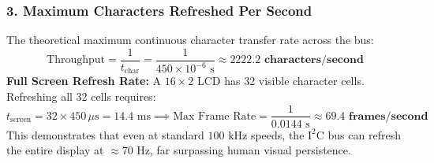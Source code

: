 \documentclass[11pt,a4paper]{article}
\begin{document}
\subsubsection*{3. Maximum Characters Refreshed Per Second}
The theoretical maximum continuous character transfer rate across the bus:
\begin{equation}
\text{Throughput} = \frac{1}{t_{\text{char}}} = \frac{1}{450\times 10^{-6}\text{ s}} \approx \mathbf{2222.2\text{ characters/second}}
\end{equation}
\textbf{Full Screen Refresh Rate:}  
A $16\times 2$ LCD has 32 visible character cells. Refreshing all 32 cells requires:
\begin{equation}
t_{\text{screen}} = 32 \times 450\,\mu\text{s} = 14.4\text{ ms} \implies \text{Max Frame Rate} = \frac{1}{0.0144\text{ s}} \approx \mathbf{69.4\text{ frames/second}}
\end{equation}
This demonstrates that even at standard $100\text{ kHz}$ speeds, the $\text{I}^2\text{C}$ bus can refresh the entire display at $\approx 70\text{ Hz}$, far surpassing human visual persistence.
\end{document}
